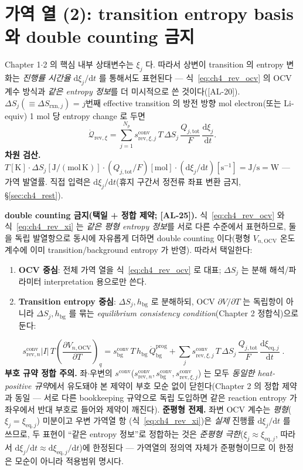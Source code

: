 \documentclass[11pt,a4paper]{article}
\newcommand{\dd}{\mathrm{d}}
\newcommand{\eq}{\mathrm{eq}}
\newcommand{\bg}{\mathrm{bg}}
\newcommand{\OCV}{\mathrm{OCV}}
\newcommand{\tot}{\mathrm{tot}}
\newcommand{\rev}{\mathrm{rev}}
\newcommand{\rxn}{\mathrm{rxn}}
\newcommand{\conv}{\mathrm{conv}}
\newcommand{\prog}{\mathrm{prog}}
\newcommand{\AL}[1]{\textsf{[AL-#1]}}
\begin{document}
\section{가역 열 (2): transition entropy basis 와 double counting 금지}\label{sec:ch4_revxi}
Chapter 1$\cdot$2 의 핵심 내부 상태변수는 $\xi_j$ 다. 따라서 상변이 transition 의 entropy 변화는 \emph{진행률
시간율} $\dd\xi_j/\dd t$ 를 통해서도 표현된다 — 식~\eqref{eq:ch4_rev_ocv} 의 OCV 계수 방식과 \emph{같은 entropy
정보}를 더 미시적으로 쓴 것이다(\AL{20}). $\Delta S_j(\equiv\Delta S_{\rxn,j})$ = $j$번째 effective transition
의 방전 방향 mol electron(또는 Li-equiv) 1 mol 당 entropy change 로 두면
\begin{equation}
\dot{\mathcal Q}_{\rev,\xi}=\sum_{j=1}^{N_p}s_{\rev,\xi,j}^{\conv}\,T\,\Delta S_j\,\frac{Q_{j,\tot}}{F}\,\frac{\dd\xi_j}{\dd t}.
\label{eq:ch4_rev_xi}
\end{equation}
\textbf{차원 검산.} $T[\mathrm K]\cdot\Delta S_j[\mathrm{J/(mol\,K)}]\cdot(Q_{j,\tot}/F)[\mathrm{mol}]\cdot
(\dd\xi_j/\dd t)[\mathrm{s^{-1}}]=\mathrm{J/s}=\mathrm W$ — 가역 발열률. 직접 입력은 $\dd\xi_j/\dd t$(휴지 구간서
정전류 좌표 변환 금지, \S\ref{sec:ch4_rest}).

\textbf{double counting 금지(택일 + 정합 제약; \AL{25}).} 식~\eqref{eq:ch4_rev_ocv} 와 식~\eqref{eq:ch4_rev_xi}
는 \emph{같은 평형 entropy 정보}를 서로 다른 수준에서 표현하므로, 둘을 독립 발열항으로 동시에 자유롭게 더하면
double counting 이다(평형 $V_{n,\OCV}$ 온도계수에 이미 transition/background entropy 가 반영). 따라서 택일한다:
\begin{enumerate}[label=\Alph*),leftmargin=2.0em]
\item \textbf{OCV 중심}: 전체 가역 열을 식~\eqref{eq:ch4_rev_ocv} 로 대표; $\Delta S_j$ 는 분해 해석/파라미터
  interpretation 용으로만 쓴다.
\item \textbf{Transition entropy 중심}: $\Delta S_j,h_\bg$ 로 분해하되, OCV $\partial V/\partial T$ 는 독립항이
  아니라 $\Delta S_j,h_\bg$ 를 묶는 \emph{equilibrium consistency condition}(Chapter 2 정합식)으로 둔다:
\end{enumerate}
\begin{equation}
\boxed{\;s_{\rev,n}^{\conv}|I|\,T\left(\frac{\partial V_{n,\OCV}}{\partial T}\right)_q
=s_\bg^{\conv}\,T\,h_\bg\,\dot Q_\bg^{\prog}
+\sum_j s_{\rev,\xi,j}^{\conv}\,T\,\Delta S_j\,\frac{Q_{j,\tot}}{F}\,\frac{\dd\xi_{\eq,j}}{\dd t}\;.}
\label{eq:ch4_consistency}
\end{equation}
\textbf{부호 규약 정합 주의.} 좌$\cdot$우변의 $s^{\conv}$($s_{\rev,n}^{\conv},s_\bg^{\conv},s_{\rev,\xi,j}^{\conv}$)
는 모두 \emph{동일한 heat-positive 규약}에서 유도돼야 본 제약이 부호 모순 없이 닫힌다(Chapter 2 의 정합 제약과
동일 — 서로 다른 bookkeeping 규약으로 독립 도입하면 같은 reaction entropy 가 좌우에서 반대 부호로 들어와 제약이
깨진다). \textbf{준평형 전제.} 좌변 OCV 계수는 \emph{평형}($\xi_j=\xi_{\eq,j}$) 미분이고 우변 가역열 항
(식~\eqref{eq:ch4_rev_xi})은 \emph{실제} 진행률 $\dd\xi_j/\dd t$ 를 쓰므로, 두 표현이 ``같은 entropy 정보''로
정합하는 것은 \emph{준평형 극한}($\xi_j\approx\xi_{\eq,j}$, 따라서 $\dd\xi_j/\dd t\approx\dd\xi_{\eq,j}/\dd t$)에
한정된다 — 가역열의 정의역 자체가 준평형이므로 이 한정은 모순이 아니라 적용범위 명시다.
\end{document}
